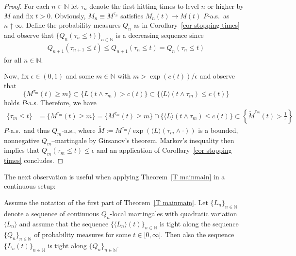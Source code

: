 \begin{proof}
For each $n \in\mathbb{N}$ let $\tau_{n}$ denote the first hitting times to
level $n$ or higher by $M$ and fix $t > 0$. Obviously, $M_{n}\equiv
M^{\tau_{n}}$ satisfies $M_{n}(t) \rightarrow M(t)$ $P$-a.s.~as $n \uparrow
\infty$. Define the probability measures $Q_{n}$ as in Corollary~\ref{cor
stopping times} and observe that $\{Q_n(\tau_n \leq t)\}_{n \in \mathbb{N}}$
is a decreasing sequence since
\begin{align*}
Q_{n+1}(\tau_{n+1} \leq t) \leq Q_{n+1}(\tau_n \leq t) = Q_n(\tau_n \leq t)
\end{align*}
for all $n \in \mathbb{N}$.

Now, fix $\epsilon \in (0,1)$ and some $m \in \mathbb{N}$ with $m >
\exp(c(t)) / \epsilon$ and observe that
\begin{equation*}
\{M^{\tau_{m}}(t) \geq m\} \subset \{L(t \wedge \tau_m) > c(t)\} \subset \{
\langle L \rangle(t \wedge \tau_m) \leq c(t) \}
\end{equation*}
holds $P$-a.s. Therefore, we have
\begin{align*}
\{\tau_m \leq t\} &= \{M^{\tau_{m}}(t) \geq m\} = \{M^{\tau_{m}}(t) \geq m\}
\cap \{ \langle L \rangle(t \wedge \tau_m) \leq c(t) \} \subset \left\{%
\widetilde{M}^{\tau_{m}}(t) > \frac{1}{\epsilon}\right\}
\end{align*}
$P$-a.s.~and thus $Q_{m}$-a.s., where $\widetilde{M} :=
M^{\tau_m}/\exp(\langle L \rangle(\tau_{m} \wedge \cdot))$ is a bounded,
nonnegative $Q_{m}$--martingale by Girsanov's theorem. Markov's inequality
then implies that $Q_{m}(\tau_{m} \leq t) \leq \epsilon$  and an application
of Corollary~\ref{cor stopping times} concludes.
\end{proof}

The next observation is useful when applying Theorem~\ref{T mainmain} in a
continuous setup:

\begin{lemma}
\label{L quadVar} Assume the notation of the first part of Theorem~\ref{T
mainmain}. Let $\{L_{n}\}_{n\in \mathbb{N}}$ denote a sequence of continuous
$Q_{n}$-local martingales with quadratic variation $\langle L_{n}\rangle $
and assume that the sequence $\{\langle L_{n}\rangle (t)\}_{n\in \mathbb{N}}$
is tight along the sequence $\{Q_{n}\}_{n\in \mathbb{N}}$ of probability
measures for some $t\in \lbrack 0,\infty ]$. Then also the sequence $%
\{L_{n}(t)\}_{n\in \mathbb{N}}$ is tight along $\{Q_{n}\}_{n\in \mathbb{N}}$.
\end{lemma}


